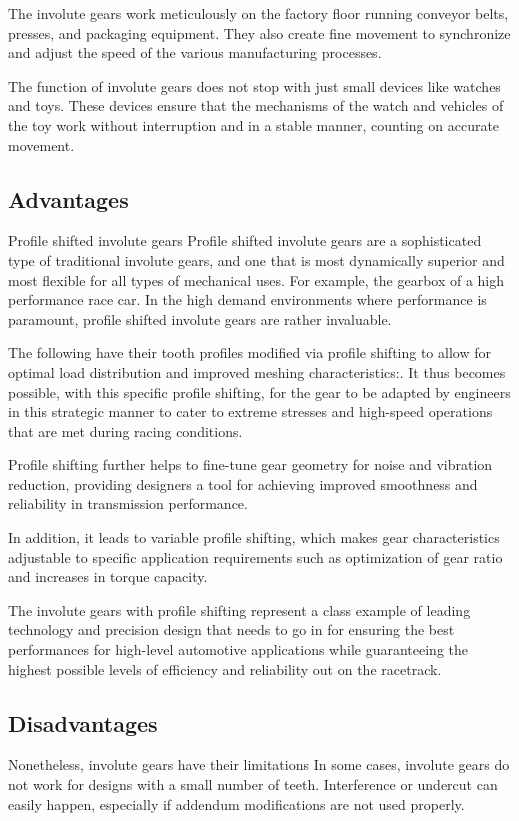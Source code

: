 \documentclass{article}
\begin{document}
The involute gears work meticulously on the factory floor running conveyor belts, presses, and packaging equipment. They also create fine movement to synchronize and adjust the speed of the various manufacturing processes.

The function of involute gears does not stop with just small devices like watches and toys. These devices ensure that the mechanisms of the watch and vehicles of the toy work without interruption and in a stable manner, counting on accurate movement.

\subsection{Advantages}
Profile shifted involute gears Profile shifted involute gears are a sophisticated type of traditional involute gears, and one that is most dynamically superior and most flexible for all types of mechanical uses. For example, the gearbox of a high performance race car. In the high demand environments where performance is paramount, profile shifted involute gears are rather invaluable. 

The following have their tooth profiles modified via profile shifting to allow for optimal load distribution and improved meshing characteristics:. It thus becomes possible, with this specific profile shifting, for the gear to be adapted by engineers in this strategic manner to cater to extreme stresses and high-speed operations that are met during racing conditions. 

Profile shifting further helps to fine-tune gear geometry for noise and vibration reduction, providing designers a tool for achieving improved smoothness and reliability in transmission performance. 

In addition, it leads to variable profile shifting, which makes gear characteristics adjustable to specific application requirements such as optimization of gear ratio and increases in torque capacity. 

The involute gears with profile shifting represent a class example of leading technology and precision design that needs to go in for ensuring the best performances for high-level automotive applications while guaranteeing the highest possible levels of efficiency and reliability out on the racetrack.
\subsection{Disadvantages}
Nonetheless, involute gears have their limitations 
In some cases, involute gears do not work for designs with a small number of teeth. Interference or undercut can easily happen, especially if addendum modifications are not used properly.
\end{document}

